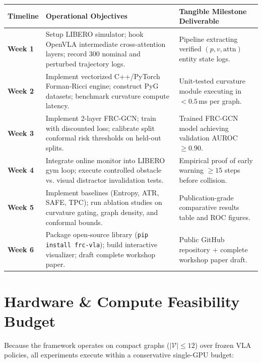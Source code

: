 \documentclass[10pt,a4paper]{article}
\begin{document}
\begin{center}
\small
\begin{tabularx}{\textwidth}{l p{7.5cm} X}
\toprule
\textbf{Timeline} & \textbf{Operational Objectives} & \textbf{Tangible Milestone Deliverable} \\
\midrule
\textbf{Week 1} & Setup LIBERO simulator; hook OpenVLA intermediate cross-attention layers; record 300 nominal and perturbed trajectory logs. & Pipeline extracting verified $(p, v, \text{attn})$ entity state logs. \\
\textbf{Week 2} & Implement vectorized C++/PyTorch Forman-Ricci engine; construct PyG datasets; benchmark curvature compute latency. & Unit-tested curvature module executing in $<0.5$\,ms per graph. \\
\textbf{Week 3} & Implement 2-layer FRC-GCN; train with discounted loss; calibrate split conformal risk thresholds on held-out splits. & Trained FRC-GCN model achieving validation AUROC $\ge 0.90$. \\
\textbf{Week 4} & Integrate online monitor into LIBERO gym loop; execute controlled obstacle vs. visual distractor invalidation tests. & Empirical proof of early warning $\ge 15$ steps before collision. \\
\textbf{Week 5} & Implement baselines (Entropy, ATR, SAFE, TPC); run ablation studies on curvature gating, graph density, and conformal bounds. & Publication-grade comparative results table and ROC figures. \\
\textbf{Week 6} & Package open-source library (\texttt{pip install frc-vla}); build interactive visualizer; draft complete workshop paper. & Public GitHub repository + complete workshop paper draft. \\
\bottomrule
\end{tabularx}
\end{center}

\section{Hardware \& Compute Feasibility Budget}

Because the framework operates on compact graphs ($|\mathcal{V}| \le 12$) over frozen VLA policies, all experiments execute within a conservative single-GPU budget:
\end{document}
